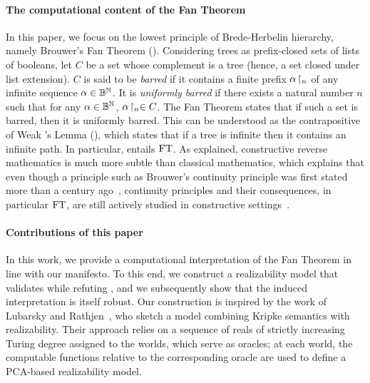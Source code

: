\documentclass[a4paper,UKenglish,cleveref, autoref, thm-restate]{lipics-v2021}
\begin{document}
\paragraph*{The computational content of the Fan Theorem}


In this paper, we focus on the lowest principle of Brede-Herbelin hierarchy, namely Brouwer's Fan Theorem (\FT). Considering trees as prefix-closed sets of lists of booleans, let $C$ be a set whose complement is a tree (hence, a set closed under list extension).
$C$ is said to be \emph{barred} if it contains a finite prefix ${\alpha}\!\upharpoonright_{n}$ of any infinite sequence %
$\alpha\in\mathbb B^\mathbb N$. It is \emph{uniformly barred} if there exists a natural number $n$ such that for any
$\alpha\in\mathbb B^\mathbb N$, ${\alpha}\!\upharpoonright_{n}\in C$.
The Fan Theorem states that if such a set is barred, then it is uniformly barred. This can be understood as the contrapositive of Weak \Konig's Lemma (\WKL), which states that if a tree is infinite then it contains an infinite path.
In particular, \WKL entails $\mathrm{FT}$.
As explained, constructive reverse mathematics is much more subtle than classical mathematics, which explains that even though a principle such as Brouwer's continuity principle was first stated more than a century ago~\cite{Brouwer1919}, continuity principles and their consequences, in particular $\mathrm{FT}$, are still actively studied in constructive settings~\cite{VanAttenVanDalen2002,VeldmanBrouwer2022,BergerDecomposition2009,FujiwaraExtensionEquivalenceBrouwers2022,FujiwaraChoicePrinciplesCharacterizing2025,BaiEtAl25,CohRah23}.



\paragraph*{Contributions of this paper}
In this work, we provide a computational interpretation of the Fan Theorem in line with our manifesto. To this end, we construct a realizability model that validates \FT while refuting \WKL, and we subsequently show that the induced interpretation is itself robust.
Our construction is inspired by the work of Lubarsky and Rathjen~\cite{LubRat13}, who sketch a model combining Kripke semantics with realizability. Their approach relies on a sequence of reals of strictly increasing Turing degree assigned to the worlds, which serve as oracles; at each world, the computable functions relative to the corresponding oracle are used to define a PCA-based realizability model.
\end{document}
